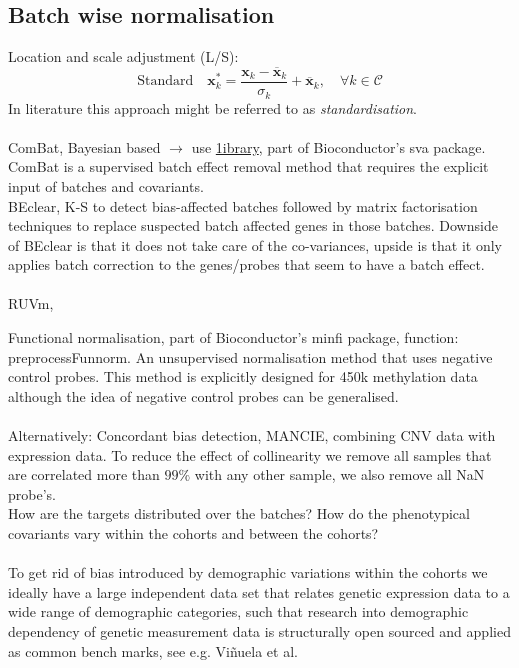 \documentclass[a4paper,10pt]{article}
\begin{document}
\subsection{Batch wise normalisation}
%
Location and scale adjustment (L/S):
\begin{equation}
\mbox{Standard}\quad \mathbf{x}^*_k= \frac{\mathbf{x}_k-\overline{\mathbf{x}}_k}{\sigma_k} + \overline{\mathbf{x}}_k,\quad \forall k\in \mathcal{C}
\end{equation}
%
In literature this approach might be referred to as \textit{standardisation}. \\ \\
%
ComBat, Bayesian based $\rightarrow$ use \href{http://www.bu.edu/jlab/wp-assets/ComBat/Abstract.html}{1ibrary}, part of Bioconductor's sva package. ComBat is a supervised batch effect removal method that requires the explicit input of batches and covariants.\\
%
BEclear, K-S to detect bias-affected batches followed by matrix factorisation techniques to replace suspected batch affected genes in those batches. Downside of BEclear is that it does not take care of the co-variances, upside is that
it only applies batch correction to the genes/probes that seem to have a batch effect. \\ \\
% 
RUVm, 

Functional normalisation, part of Bioconductor's minfi package, function: preprocessFunnorm. An unsupervised 
normalisation method that uses negative control probes. This method is explicitly designed for 450k methylation
data although the idea of negative control probes can be generalised. \\ \\
% 
Alternatively: Concordant bias detection, MANCIE, combining CNV data with expression data.
%
To reduce the effect of collinearity we remove all samples that are correlated more than $99\%$ with 
any other sample, we also remove all NaN probe's. \\ 

%
How are the targets distributed over the batches? How do the phenotypical covariants vary within the 
cohorts and between the cohorts? \\ \\
%
To get rid of bias introduced by demographic variations within the cohorts we ideally have a large
independent data set that relates genetic expression data to a wide range of demographic categories, such that research into
demographic dependency of genetic measurement data is structurally open sourced and applied as common bench marks, see e.g. 
Vi\~{n}uela et al\cite{Vinuela2018}.
%
\end{document}
